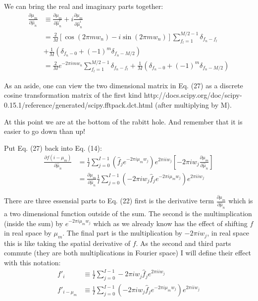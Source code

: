 \documentclass[11pt]{article}
\begin{document}
We can bring the real and imaginary parts together:
\begin{align}
   \frac{\partial \mu_m}{\partial \hat{\mu}_n} &\equiv \frac{\partial \mu_m}{\partial \hat{\mu}^r_n} + i \frac{\partial \mu_m}{\partial \hat{\mu}^i_n} \\
   &= \frac{2}{M} \left[\cos(2\pi mw_n) - i\sin(2\pi mw_n)\right] \sum_{f_l=1}^{M/2-1} \delta_{f_n - f_l} \\
   &+ \frac{1}{M}\left(\delta_{f_n - 0} +  (-1)^m \delta_{f_n - M/2} \right) \\
   &= \frac{2}{M} e^{-2\pi i m w_n} \sum_{f_l=1}^{M/2-1} \delta_{f_n - f_l} + \frac{1}{M}\left(\delta_{f_n - 0} +  (-1)^m \delta_{f_n - M/2} \right)
\end{align}

As an aside, one can view the two dimensional matrix in Eq. (27) as a discrete cosine transformation matrix of the first kind http://docs.scipy.org/doc/scipy-0.15.1/reference/generated/scipy.fftpack.dct.html (after multiplying by M).

At this point we are at the bottom of the rabitt hole. And remember that it is easier to go down than up! 

Put Eq. (27) back into Eq. (14):
\begin{align}
   \frac{\partial f(i - \mu_m)}{\partial \hat{\mu}_n} &= \frac{1}{I} \sum_{j=0}^{I-1} (\hat{f}_j e^{-2\pi i \mu_m w_j}) e^{2\pi i i w_j} \left[-2\pi i w_j \frac{\partial \mu_m}{\partial \hat{\mu}_n} \right] \\
   &= \frac{\partial \mu_m}{\partial \hat{\mu}_n} \frac{1}{I} \sum_{j=0}^{I-1} (-2\pi i w_j \hat{f}_j e^{-2\pi i \mu_m w_j}) e^{2\pi i i w_j} 
\end{align}


There are three essensial parts to Eq. (22) first is the derivative term $\frac{\partial \mu_m}{\partial \hat{\mu}_n}$ which is a two dimensional function outside of the sum. The second is the multimplication (inside the sum) by $e^{-2\pi i \mu_m w_j}$ which as we already know has the effect of shifting $f$ in real space by $\mu_m$. The final part is the multiplication by $-2\pi i w_j$, in real space this is like taking the spatial derivative of $f$. As the second and third parts commute (they are both multiplications in Fourier space) I will define their effect with this notation:
\begin{align}
   f'_i &\equiv \frac{1}{I} \sum_{j=0}^{I-1} -2\pi i w_j \hat{f}_j e^{2\pi i i w_j} \\
   f'_{i-\mu_m} &\equiv \frac{1}{I} \sum_{j=0}^{I-1} (-2\pi i w_j \hat{f}_j e^{-2\pi i \mu_m w_j}) e^{2\pi i i w_j} 
\end{align}
\end{document}
